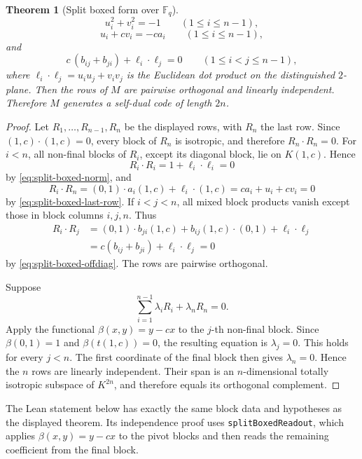 \documentclass[12pt]{article}
\newtheorem{theorem}{Theorem}[section]
\newcommand{\F}{\mathbb{F}}
\begin{document}
\begin{theorem}[Split boxed form over \texorpdfstring{$\F_q$}{Fq}]
\begin{equation}
\label{eq:split-boxed-norm}
u_i^2+v_i^2=-1
\qquad (1\le i\le n-1),
\end{equation}
\begin{equation}
\label{eq:split-boxed-last-row}
u_i+c v_i=-c a_i
\qquad (1\le i\le n-1),
\end{equation}
and
\begin{equation}
\label{eq:split-boxed-offdiag}
c\,(b_{ij}+b_{ji})+\ell_i\cdot \ell_j=0
\qquad (1\le i<j\le n-1),
\end{equation}
where \(\ell_i\cdot \ell_j=u_i u_j+v_i v_j\) is the Euclidean dot product on the distinguished \(2\)-plane. Then the rows of \(M\) are pairwise orthogonal and linearly independent. Therefore \(M\) generates a self-dual code of length \(2n\).
\end{theorem}

\begin{proof}
Let \(R_1,\ldots,R_{n-1},R_n\) be the displayed rows, with \(R_n\) the
last row.  Since \((1,c)\cdot(1,c)=0\), every block of \(R_n\) is
isotropic, and therefore \(R_n\cdot R_n=0\).  For \(i<n\), all non-final
blocks of \(R_i\), except its diagonal block, lie on \(K(1,c)\).  Hence
\[
R_i\cdot R_i=1+\ell_i\cdot\ell_i=0
\]
by \eqref{eq:split-boxed-norm}, and
\[
R_i\cdot R_n
=(0,1)\cdot a_i(1,c)+\ell_i\cdot(1,c)
=ca_i+u_i+cv_i=0
\]
by \eqref{eq:split-boxed-last-row}.  If \(i<j<n\), all mixed block
products vanish except those in block columns \(i,j,n\).  Thus
\[
\begin{aligned}
R_i\cdot R_j
&=(0,1)\cdot b_{ji}(1,c)
  +b_{ij}(1,c)\cdot(0,1)+\ell_i\cdot\ell_j\\
&=c(b_{ij}+b_{ji})+\ell_i\cdot\ell_j=0
\end{aligned}
\]
by \eqref{eq:split-boxed-offdiag}.  The rows are pairwise orthogonal.

Suppose
\[
\sum_{i=1}^{n-1}\lambda_iR_i+\lambda_nR_n=0.
\]
Apply the functional \(\beta(x,y)=y-cx\) to the \(j\)-th non-final
block.  Since \(\beta(0,1)=1\) and
\(\beta(t(1,c))=0\), the resulting equation is \(\lambda_j=0\).
This holds for every \(j<n\).  The first coordinate of the final block then
gives \(\lambda_n=0\).  Hence the \(n\) rows are linearly independent.
Their span is an \(n\)-dimensional totally isotropic subspace of \(K^{2n}\),
and therefore equals its orthogonal complement.
\end{proof}

\noindent
The Lean statement below has exactly the same block data and hypotheses as
the displayed theorem.  Its independence proof uses
\texttt{splitBoxedReadout}, which applies \(\beta(x,y)=y-cx\) to the pivot
blocks and then reads the remaining coefficient from the final block.
\end{document}
